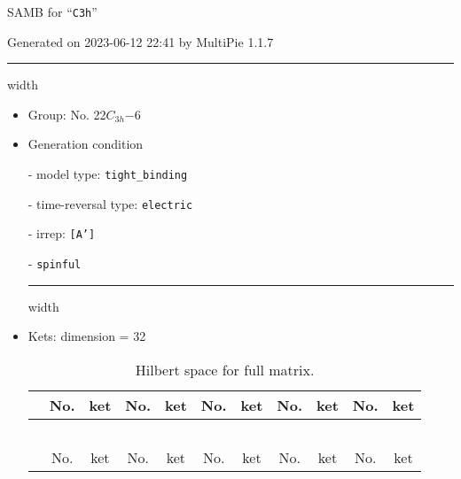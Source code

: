 \documentclass[fleqn,10pt,landscape]{article}
\begin{document}
\setcounter{MaxMatrixCols}{16}

\setlength{\baselineskip}{16pt}
\footnotesize
\begin{center}
\LARGE
SAMB for ``\texttt{C3h}''
\end{center}
\begin{flushright}
Generated on 2023-06-12 22:41 by MultiPie 1.1.7
\end{flushright}
\vspace{1cm}


 \hfil \hrule height 1mm width \textwidth \hfil

\begin{itemize}
\item Group: No. 22\quad$C_{3h}$\quad$-6$\quad[ hexagonal ]

\vspace{5mm}

\item Generation condition

\quad - model type: \texttt{tight_binding}

\quad - time-reversal type: \texttt{electric}

\quad - irrep: \texttt{[A']}

\quad - \texttt{spinful}


 \hfil \hrule height 1mm width \textwidth \hfil

\item Kets: dimension = 32
\begin{center}
\renewcommand{\arraystretch}{1.3}
\begin{longtable}{c|cc|cc|cc|cc|cc}
\caption{Hilbert space for full matrix.}
 \\
 \hline \hline
 & No. & ket & No. & ket & No. & ket & No. & ket & No. & ket \\ \hline \endfirsthead

\multicolumn{10}{l}{\tablename\ \thetable{}} \\
 \hline \hline
 & No. & ket & No. & ket & No. & ket & No. & ket & No. & ket \\ \hline \endhead


\end{longtable}
\end{center}
\end{itemize}
\end{document}
